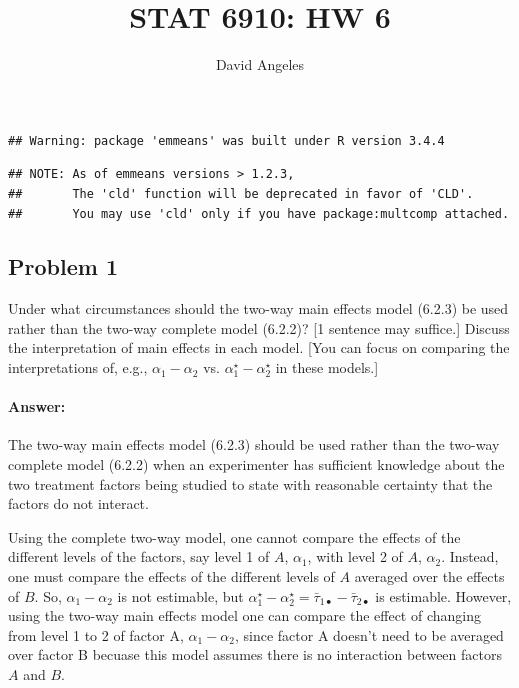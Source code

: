 \documentclass[12pt,]{article}
\title{STAT 6910: HW 6}
\author{David Angeles}
\date{}
\let\oldparagraph\paragraph
\renewcommand{\paragraph}[1]{\oldparagraph{#1}\mbox{}}
\begin{document}
\maketitle

\begin{verbatim}
## Warning: package 'emmeans' was built under R version 3.4.4
\end{verbatim}

\begin{verbatim}
## NOTE: As of emmeans versions > 1.2.3,
##       The 'cld' function will be deprecated in favor of 'CLD'.
##       You may use 'cld' only if you have package:multcomp attached.
\end{verbatim}

\subsection{Problem 1}\label{problem-1}

Under what circumstances should the two-way main effects model (6.2.3)
be used rather than the two-way complete model (6.2.2)? {[}1 sentence
may suffice.{]} Discuss the interpretation of main effects in each
model. {[}You can focus on comparing the interpretations of, e.g.,
\(\alpha_1 - \alpha_2\) vs. \(\alpha_1^\star - \alpha_2^\star\) in these
models.{]}

\paragraph{Answer:}\label{answer}

The two-way main effects model (6.2.3) should be used rather than the
two-way complete model (6.2.2) when an experimenter has sufficient
knowledge about the two treatment factors being studied to state with
reasonable certainty that the factors do not interact.

Using the complete two-way model, one cannot compare the effects of the
different levels of the factors, say level 1 of \(A\), \(\alpha_1\),
with level 2 of \(A\), \(\alpha_2\). Instead, one must compare the
effects of the different levels of \(A\) averaged over the effects of
\(B\). So, \(\alpha_1-\alpha_2\) is not estimable, but
\(\alpha^\star_1-\alpha^\star_2=\bar{\tau}_{1\bullet}-\bar{\tau}_{2\bullet}\)
is estimable. However, using the two-way main effects model one can
compare the effect of changing from level 1 to 2 of factor A,
\(\alpha_1 - \alpha_2\), since factor A doesn't need to be averaged over
factor B becuase this model assumes there is no interaction between
factors \(A\) and \(B\).
\end{document}
